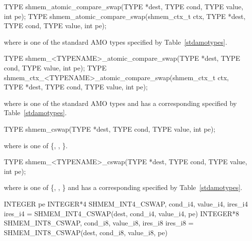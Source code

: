 
\begin{apidefinition}

\begin{C11synopsis}
TYPE shmem_atomic_compare_swap(TYPE *dest, TYPE cond, TYPE value, int pe);
TYPE shmem_atomic_compare_swap(shmem_ctx_t ctx, TYPE *dest, TYPE cond, TYPE value, int pe);
\end{C11synopsis}
where \TYPE{} is one of the standard \ac{AMO} types specified by
Table~\ref{stdamotypes}.

\begin{Csynopsis}
TYPE shmem_<TYPENAME>_atomic_compare_swap(TYPE *dest, TYPE cond, TYPE value, int pe);
TYPE shmem_ctx_<TYPENAME>_atomic_compare_swap(shmem_ctx_t ctx, TYPE *dest, TYPE cond, TYPE value, int pe);
\end{Csynopsis}
where \TYPE{} is one of the standard \ac{AMO} types and has a corresponding
\TYPENAME{} specified by Table~\ref{stdamotypes}.

\begin{DeprecateBlock}
\begin{C11synopsis}
TYPE shmem_cswap(TYPE *dest, TYPE cond, TYPE value, int pe);
\end{C11synopsis}
where \TYPE{} is one of \{, , \}.

\begin{Csynopsis}
TYPE shmem_<TYPENAME>_cswap(TYPE *dest, TYPE cond, TYPE value, int pe);
\end{Csynopsis}
where \TYPE{} is one of \{, , \}
and has a corresponding \TYPENAME{} specified by Table~\ref{stdamotypes}.
\end{DeprecateBlock}

\begin{Fsynopsis}
INTEGER pe
INTEGER*4 SHMEM_INT4_CSWAP,  cond_i4, value_i4, ires_i4
ires_i4 = SHMEM_INT4_CSWAP(dest, cond_i4, value_i4, pe)
INTEGER*8 SHMEM_INT8_CSWAP,  cond_i8, value_i8, ires_i8
ires_i8 = SHMEM_INT8_CSWAP(dest, cond_i8, value_i8, pe)
\end{Fsynopsis}


\end{apidefinition}
